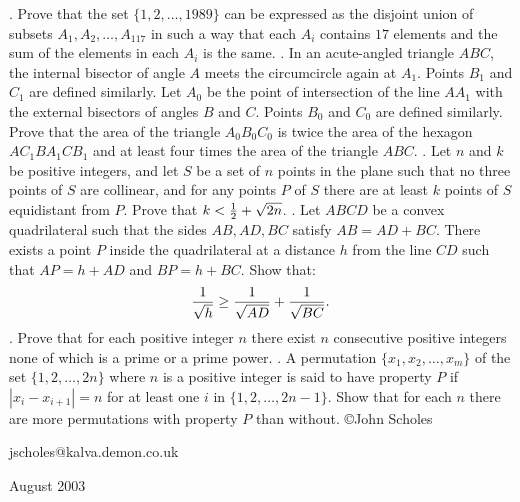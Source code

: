 \nopagenumbers
{}
\vskip 25pt
. Prove that the set $\{1,2,\ldots,1989\}$ can be expressed as the disjoint union of subsets $A_1,A_2,\ldots,A_{117}$ in such a way that each $A_i$ contains $17$ elements and the sum of the elements in each $A_i$ is the same.
\vskip 12pt
. In an acute-angled triangle $ABC$, the internal bisector of angle $A$ meets the circumcircle again at $A_1$. Points $B_1$ and $C_1$ are defined similarly. Let $A_0$ be the point of intersection of the line $AA_1$ with the external bisectors of angles $B$ and $C$. Points $B_0$ and $C_0$ are defined similarly. Prove that the area of the triangle $A_0B_0C_0$ is twice the area of the hexagon $AC_1BA_1CB_1$ and at least four times the area of the triangle $ABC$.
\vskip 12pt
. Let $n$ and $k$ be positive integers, and let $S$ be a set of $n$ points in the plane such that no three points of $S$ are collinear, and for any points $P$ of $S$ there are at least $k$ points of $S$ equidistant from $P$. Prove that $k<{1\over2}+\sqrt{2n}$.
\vskip 12pt
. Let $ABCD$ be a convex quadrilateral such that the sides $AB,AD,BC$ satisfy $AB=AD+BC$. There exists a point $P$ inside the quadrilateral at a distance $h$ from the line $CD$ such that $AP=h+AD$ and $BP=h+BC$. Show that: $${1\over\sqrt h}\ge{1\over\sqrt{AD}}+{1\over\sqrt{BC}}.$$
\vskip 12pt
. Prove that for each positive integer $n$ there exist $n$ consecutive positive integers none of which is a prime or a prime power.
\vskip 12pt
. A permutation $\{x_1,x_2,\ldots,x_m\}$ of the set $\{1,2,\ldots,2n\}$ where $n$ is a positive integer is said to have property $P$ if $|x_i-x_{i+1}|=n$ for at least one $i$ in $\{1,2,\ldots,2n-1\}$. Show that for each $n$ there are more permutations with property $P$ than without.
\vskip 20pt
\noindent \copyright John Scholes

\noindent jscholes@kalva.demon.co.uk

 August 2003

\bye
